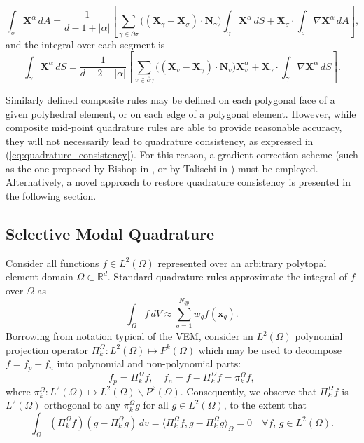 	\begin{equation}
		\int_{\sigma} \mathbf{X}^\alpha \, dA = \frac{1}{d-1+|\alpha|} \left[ \sum_{\gamma \in \partial \sigma} \big( (\mathbf{X}_\gamma-\mathbf{X}_\sigma) \cdot \mathbf{N}_{\gamma} \big) \int_{\gamma} \mathbf{X}^\alpha \, dS + \mathbf{X}_\sigma \cdot \int_{\sigma} \nabla \mathbf{X}^\alpha \, dA \right],
	\end{equation}
	and the integral over each segment is
	\begin{equation}
		\int_{\gamma} \mathbf{X}^\alpha \, dS = \frac{1}{d-2+|\alpha|} \left[ \sum_{v \in \partial \gamma} \big( (\mathbf{X}_v-\mathbf{X}_\gamma) \cdot \mathbf{N}_{v} \big) \mathbf{X}^\alpha_v + \mathbf{X}_\gamma \cdot \int_{\gamma} \nabla \mathbf{X}^\alpha \, dS \right].
	\end{equation}
	
	Similarly defined composite rules may be defined on each polygonal face of a given polyhedral element, or on each edge of a polygonal element. However, while composite mid-point quadrature rules are able to provide reasonable accuracy, they will not necessarily lead to quadrature consistency, as expressed in (\ref{eq:quadrature_consistency}). For this reason, a gradient correction scheme (such as the one proposed by Bishop in \cite{Bishop:14}, or by Talischi in \cite{Talischi:15}) must be employed. Alternatively, a novel approach to restore quadrature consistency is presented in the following section.
		
	\subsection*{Selective Modal Quadrature}
	
	Consider all functions $f \in L^2 (\Omega)$ represented over an arbitrary polytopal element domain $\Omega \subset \mathbb{R}^d$. Standard quadrature rules approximate the integral of $f$ over $\Omega$ as
	\begin{equation}
		\int_\Omega f \, dV \approx \sum_{q=1}^{N_{qp}} w_q f(\mathbf{x}_q).
	\end{equation}
	Borrowing from notation typical of the VEM, consider an $L^2 (\Omega)$ polynomial projection operator $\Pi^{\Omega}_k : L^2 (\Omega) \mapsto P^k (\Omega)$ which may be used to decompose $f = f_p + f_n$ into polynomial and non-polynomial parts:
	\begin{equation}
		f_p = \Pi^{\Omega}_k f, \quad f_n = f - \Pi^{\Omega}_k f = \pi^{\Omega}_k f,
	\end{equation}
	where $\pi^{\Omega}_k : L^2 (\Omega) \mapsto L^2 (\Omega) \backslash P^k (\Omega)$. Consequently, we observe that $\Pi^{\Omega}_k f$ is $L^2 (\Omega)$ orthogonal to any $\pi^{\Omega}_k g$ for all $g \in L^2 (\Omega)$, to the extent that
	\begin{equation}
		\int_{\Omega} (\Pi^{\Omega}_k f) (g - \Pi^{\Omega}_k g) \, dv = \langle \Pi^{\Omega}_k f, g - \Pi^{\Omega}_k g \rangle_{\Omega} = 0 \quad \forall f, \, g \in L^2 (\Omega).
	\end{equation}
	
